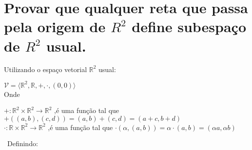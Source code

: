 \documentclass[12pt, twoside, a4]{article} %
\begin{document}
\section{Provar que qualquer reta que passa pela origem de $R^2$ define subespaço de $R^2$ usual.}

Utilizando o espaço vetorial $ \mathbb{R}^2 $  usual:
\begin{center}
    $ \mathcal{V} = \langle \mathbb{R}^2, \mathbb{R}, +, \cdot , (0,0)    \rangle  $ \\
    Onde         
    \begin{doublespacing}
        $ + : \mathbb{R}^2 \times \mathbb{R}^2 \to \mathbb{R}^2  $ ,é uma função tal que $ +((a, b), (c, d)) = (a, b) + (c, d) = (a + c, b + d)$  \\
        $ \cdot : \mathbb{R} \times \mathbb{R}^2 \to \mathbb{R}^2 $ ,é uma função tal que $ \cdot (\alpha, (a, b)) = \alpha \cdot (a, b) = (\alpha a, \alpha b) $
    \end{doublespacing}
\end{center}
\
Definindo: 
\end{document}
